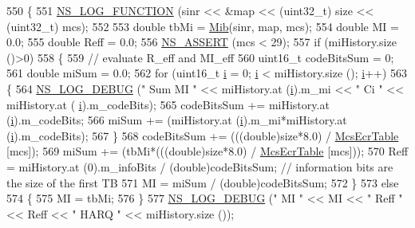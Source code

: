 \begin{DoxyCode}
550 \{
551   \hyperlink{log-macros-disabled_8h_a90b90d5bad1f39cb1b64923ea94c0761}{NS\_LOG\_FUNCTION} (sinr << &map << (uint32\_t) size << (uint32\_t) mcs);
552 
553   \textcolor{keywordtype}{double} tbMi = \hyperlink{classns3_1_1LteMiErrorModel_aeb98520a67e7e4ab119bbc8c70727f1b}{Mib}(sinr, map, mcs);
554   \textcolor{keywordtype}{double} MI = 0.0;
555   \textcolor{keywordtype}{double} Reff = 0.0;
556   \hyperlink{assert_8h_a6dccdb0de9b252f60088ce281c49d052}{NS\_ASSERT} (mcs < 29);
557   \textcolor{keywordflow}{if} (miHistory.size ()>0)
558     \{
559       \textcolor{comment}{// evaluate R\_eff and MI\_eff}
560       uint16\_t codeBitsSum = 0;
561       \textcolor{keywordtype}{double} miSum = 0.0;
562       \textcolor{keywordflow}{for} (uint16\_t \hyperlink{bernuolliDistribution_8m_a6f6ccfcf58b31cb6412107d9d5281426}{i} = 0; \hyperlink{bernuolliDistribution_8m_a6f6ccfcf58b31cb6412107d9d5281426}{i} < miHistory.size (); \hyperlink{bernuolliDistribution_8m_a6f6ccfcf58b31cb6412107d9d5281426}{i}++)
563         \{
564           \hyperlink{group__logging_ga413f1886406d49f59a6a0a89b77b4d0a}{NS\_LOG\_DEBUG} (\textcolor{stringliteral}{" Sum MI "} << miHistory.at (\hyperlink{bernuolliDistribution_8m_a6f6ccfcf58b31cb6412107d9d5281426}{i}).m\_mi << \textcolor{stringliteral}{" Ci "} << miHistory.at (
      \hyperlink{bernuolliDistribution_8m_a6f6ccfcf58b31cb6412107d9d5281426}{i}).m\_codeBits);
565           codeBitsSum += miHistory.at (\hyperlink{bernuolliDistribution_8m_a6f6ccfcf58b31cb6412107d9d5281426}{i}).m\_codeBits;
566           miSum += (miHistory.at (\hyperlink{bernuolliDistribution_8m_a6f6ccfcf58b31cb6412107d9d5281426}{i}).m\_mi*miHistory.at (\hyperlink{bernuolliDistribution_8m_a6f6ccfcf58b31cb6412107d9d5281426}{i}).m\_codeBits);
567         \}
568       codeBitsSum += (((double)size*8.0) / \hyperlink{namespacens3_a5e80c75db664b51189d262e55aba06be}{McsEcrTable} [mcs]);
569       miSum += (tbMi*(((double)size*8.0) / \hyperlink{namespacens3_a5e80c75db664b51189d262e55aba06be}{McsEcrTable} [mcs]));
570       Reff = miHistory.at (0).m\_infoBits / (double)codeBitsSum; \textcolor{comment}{// information bits are the size of the
       first TB}
571       MI = miSum / (double)codeBitsSum;      
572     \}
573   \textcolor{keywordflow}{else}
574     \{
575       MI = tbMi;
576     \}
577   \hyperlink{group__logging_ga413f1886406d49f59a6a0a89b77b4d0a}{NS\_LOG\_DEBUG} (\textcolor{stringliteral}{" MI "} << MI << \textcolor{stringliteral}{" Reff "} << Reff << \textcolor{stringliteral}{" HARQ "} << miHistory.size ());

\end{DoxyCode}
